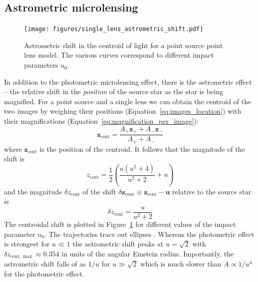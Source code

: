 \documentclass[12pt,dvipsnames]{report}
\renewcommand{\vec}[1]{\boldsymbol{\mathbf{#1}}}
\begin{document}
\subsection{Astrometric microlensing}
\label{ssec:astrometric_microlensing}
\begin{figure}[t]
    \begin{centering}
        \texttt{[image: figures/single\_lens\_astrometric\_shift.pdf]}
        \caption{
            Astrometric shift in the centroid of light for a point source point lens
            model.
            The various curves correspond to different impact parameters $u_0$.}
        \label{fig:single_lens_astrometric_shift}
    \end{centering}
\end{figure}

In addition to the photometric microlensing effect, there is the astrometric
effect -- the relative shift in the \emph{position} of the source star as the
star is being magnified. For a point source and a single lens we can
obtain the centroid of the two images by weighing their positions
(Equation~\ref{eq:images_location}) with their magnifications
(Equation~\ref{eq:magnification_per_image}):
\begin{equation}
    \vec z_\mathrm{cent}=\frac{A_+\vec z_+ + A_-\vec z_-}{A_+ + A_-}
    \label{eq:centroid_single_lens}
\end{equation}
where $\vec z_\mathrm{cent}$ is the position of the centroid. It follows that the magnitude of the
shift is
\begin{equation}
    z_\mathrm{cent}=\frac{1}{2}\left(\frac{u(u^2 + 4)}{u^2+2}+u\right)
\end{equation}
and the magnitude $\delta z_\mathrm{cent}$ of the shift
$\delta \vec z_\mathrm{cent}\equiv\vec z_\mathrm{cent} - \vec u$ relative to the source star is
\begin{equation}
    \delta z_\mathrm{cent} = \frac{u}{u^2 + 2}
\end{equation}
The centroidal shift is plotted in Figure~\ref{fig:single_lens_astrometric_shift} for
different values of the impact parameter $u_0$. The trajectories trace out ellipses
\citep{1995ApJ...453...37W}.
Whereas the photometric effect is
strongest for
$u\ll 1$  the astrometric shift peaks at $u=\sqrt{2}$ with
$\delta z_{\mathrm{cent},\max}\approx 0.354$ in units of the angular Einstein radius.
Importantly, the astrometric shift falls of as $1/u$ for $u\gg \sqrt{2}$  which is
much slower than $A\propto 1/u^4$ for the photometric effect.
\end{document}
